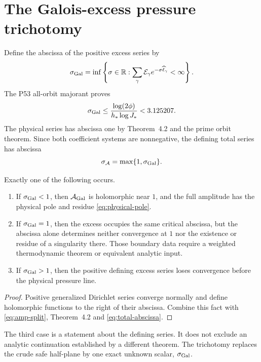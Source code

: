 \section{The Galois-excess pressure trichotomy}

Define the abscissa of the positive excess series by
\begin{equation}
\sigma_{\rm Gal}
=\inf\left\{\sigma\in\mathbb R:
\sum_\gamma \mathcal E_\gamma
e^{-\sigma\widehat\ell_\gamma}<\infty\right\}.
\label{eq:sigma-gal}
\end{equation}
The P53 all-orbit majorant proves
\begin{equation}
\sigma_{\rm Gal}
\le \frac{\log(2\phi)}{h_*\log J_*}
<3.125207.
\label{eq:sigma-upper}
\end{equation}
The physical series has abscissa one by Theorem~4.2 and the prime orbit
theorem.  Since both coefficient systems are nonnegative, the defining total
series has abscissa
\begin{equation}
\sigma_{\mathcal A}=\max\{1,\sigma_{\rm Gal}\}.
\label{eq:total-abscissa}
\end{equation}

\begin{theorem}
Exactly one of the following occurs.
\begin{enumerate}
\item If \(\sigma_{\rm Gal}<1\), then \(\mathcal A_{\rm Gal}\) is holomorphic
near \(1\), and the full amplitude has the physical pole and residue
\eqref{eq:physical-pole}.
\item If \(\sigma_{\rm Gal}=1\), then the excess occupies the same critical
abscissa, but the abscissa alone determines neither convergence at \(1\) nor
the existence or residue of a singularity there.  Those boundary data require
a weighted thermodynamic theorem or equivalent analytic input.
\item If \(\sigma_{\rm Gal}>1\), then the positive defining excess series
loses convergence before the physical pressure line.
\end{enumerate}
\end{theorem}

\begin{proof}
Positive generalized Dirichlet series converge normally and define
holomorphic functions to the right of their abscissa.  Combine this fact with
\eqref{eq:amp-split}, Theorem~4.2 and \eqref{eq:total-abscissa}.
\end{proof}

The third case is a statement about the defining series.  It does not exclude
an analytic continuation established by a different theorem.  The
trichotomy replaces the crude safe half-plane by one exact unknown scalar,
\(\sigma_{\rm Gal}\).
